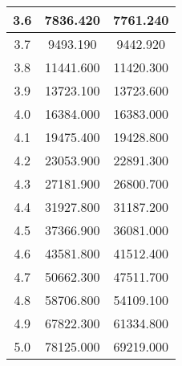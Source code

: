 \begin{table}[h!]
\begin{tabular}{|c|c|c|}
        3.6        & 7836.420       & 7761.240                                         \\ \hline
        3.7        & 9493.190       & 9442.920                                         \\ \hline
        3.8        & 11441.600      & 11420.300                                        \\ \hline
        3.9        & 13723.100      & 13723.600                                        \\ \hline
        4.0        & 16384.000      & 16383.000                                        \\ \hline
        4.1        & 19475.400      & 19428.800                                        \\ \hline
        4.2        & 23053.900      & 22891.300                                        \\ \hline
        4.3        & 27181.900      & 26800.700                                        \\ \hline
        4.4        & 31927.800      & 31187.200                                        \\ \hline
        4.5        & 37366.900      & 36081.000                                        \\ \hline
        4.6        & 43581.800      & 41512.400                                        \\ \hline
        4.7        & 50662.300      & 47511.700                                        \\ \hline
        4.8        & 58706.800      & 54109.100                                        \\ \hline
        4.9        & 67822.300      & 61334.800                                        \\ \hline
        5.0        & 78125.000      & 69219.000                                        \\ \hline
    \end{tabular}\label{tab:table3}
\end{table}
